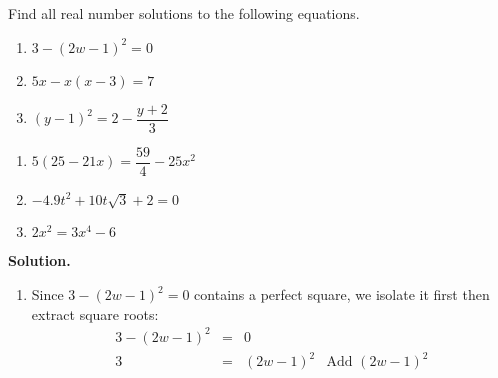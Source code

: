 \documentclass{ximera}
\begin{document}
\begin{example}\label{reviewquadraticex}  Find all real number solutions to the following equations.

\begin{multicols}{3}

\begin{enumerate}

\item $3 - (2w-1)^2 = 0$

\item $5x - x(x-3) = 7$

\item  $(y-1)^2 = 2 - \dfrac{y+2}{3}$ 

\setcounter{HW}{\value{enumi}}

\end{enumerate}
\end{multicols}

\begin{multicols}{3}

\begin{enumerate}

\setcounter{enumi}{\value{HW}}

\item $5(25 - 21x) = \dfrac{59}{4} - 25x^2$

\item $-4.9t^2 + 10t\sqrt{3} + 2 = 0$ 



\item $2x^2 = 3x^4 - 6$



\setcounter{HW}{\value{enumi}}

\end{enumerate}
\end{multicols}

{\bf Solution.}

\begin{enumerate}

\item  Since $3 - (2w-1)^2 = 0$ contains a perfect square, we isolate it first then extract square roots: \[ \begin{array}{rclr}

3 - (2w-1)^2 & = & 0 & \\

3 & = & (2w-1)^2 & \text{Add $(2w-1)^2$} \\


\end{array}\]
\end{enumerate}
\end{example}
\end{document}
